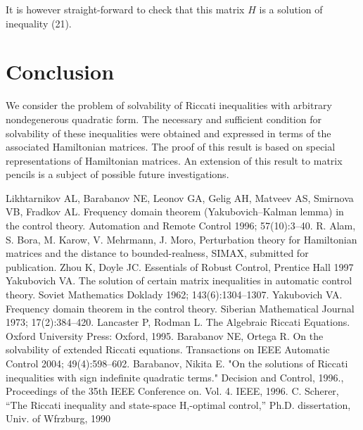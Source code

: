 \documentclass[11pt, reqno]{amsart}
\theoremstyle{plain}
\begin{document}
It is however straight-forward to check that this matrix $H$ is a solution of inequality (21). 















%
%
\section{Conclusion}

We consider the problem of solvability of Riccati inequalities with arbitrary nondegenerous quadratic form. The necessary and sufficient condition for solvability of these inequalities were obtained and expressed in terms of the associated Hamiltonian matrices. The proof of this result is based on special representations of Hamiltonian matrices. An extension of this result to matrix pencils is a subject of possible future investigations.





\begin{thebibliography}{99} 

 Likhtarnikov AL, Barabanov NE, Leonov GA, Gelig AH, Matveev AS, Smirnova VB, Fradkov AL. Frequency domain theorem (Yakubovich–Kalman lemma) in the control theory. Automation and Remote Control 1996; 57(10):3–40.
 R. Alam, S. Bora, M. Karow, V. Mehrmann, J. Moro, Perturbation theory for Hamiltonian matrices and the distance to bounded-realness, SIMAX, submitted for publication.
Zhou K,  Doyle JC. Essentials of Robust Control, Prentice Hall 1997 
 Yakubovich VA. The solution of certain matrix inequalities in automatic control theory. Soviet Mathematics Doklady 1962; 143(6):1304–1307.
 Yakubovich VA. Frequency domain theorem in the control theory. Siberian Mathematical Journal 1973; 17(2):384–420.
 Lancaster P, Rodman L. The Algebraic Riccati Equations. Oxford University Press: Oxford, 1995.
 Barabanov NE, Ortega R. On the solvability of extended Riccati equations. Transactions on IEEE Automatic Control 2004; 49(4):598–602.
Barabanov, Nikita E. "On the solutions of Riccati inequalities with sign indefinite quadratic terms." Decision and Control, 1996., Proceedings of the 35th IEEE Conference on. Vol. 4. IEEE, 1996.
 C. Scherer, “The Riccati inequality and state-space H,-optimal
control,” Ph.D. dissertation, Univ. of Wfrzburg, 1990


\end{thebibliography}
\end{document}
